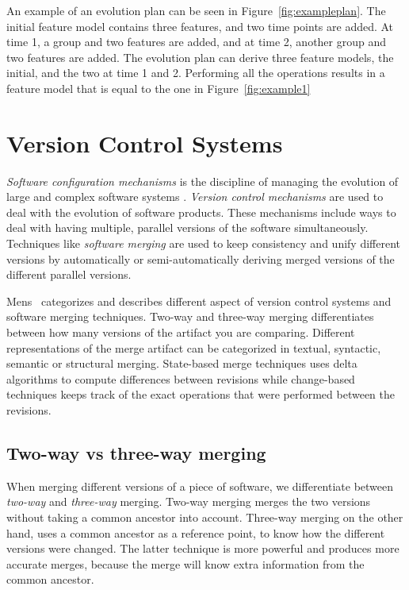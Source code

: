 \documentclass[a4paper,english]{ifimaster}
\begin{document}
An example of an evolution plan can be seen in Figure~\vref{fig:exampleplan}. The initial feature model contains three features, and two time points are added. At time 1, a group and two features are added, and at time 2, another group and two features are added. The evolution plan can derive three feature models, the initial, and the two at time 1 and 2. Performing all the operations results in a feature model that is equal to the one in Figure~\vref{fig:example1}

\section{Version Control Systems}%
\label{sec:version_control_systems}

\textit{Software configuration mechanisms} is the discipline of managing the evolution of large and complex software systems \cite{cite:software_configuration_management}. \textit{Version control mechanisms} are used to deal with the evolution of software products. These mechanisms include ways to deal with having multiple, parallel versions of the software simultaneously. Techniques like \textit{software merging} are used to keep consistency and unify different versions by automatically or semi-automatically deriving merged versions of the different parallel versions.

Mens~\cite{cite:tom_mens_software_merging_survey} categorizes and describes different aspect of version control systems and software merging techniques. Two-way and three-way merging differentiates between how many versions of the artifact you are comparing. Different representations of the merge artifact can be categorized in textual, syntactic, semantic or structural merging. State-based merge techniques uses delta algorithms to compute differences between revisions while change-based techniques keeps track of the exact operations that were performed between the revisions.

\subsection{Two-way vs three-way merging}%
\label{sub:two_way_vs_three_way_merging}

When merging different versions of a piece of software, we differentiate between \textit{two-way} and \textit{three-way} merging. Two-way merging merges the two versions without taking a common ancestor into account. Three-way merging on the other hand, uses a common ancestor as a reference point, to know how the different versions were changed. The latter technique is more powerful and produces more accurate merges, because the merge will know extra information from the common ancestor.
\end{document}
